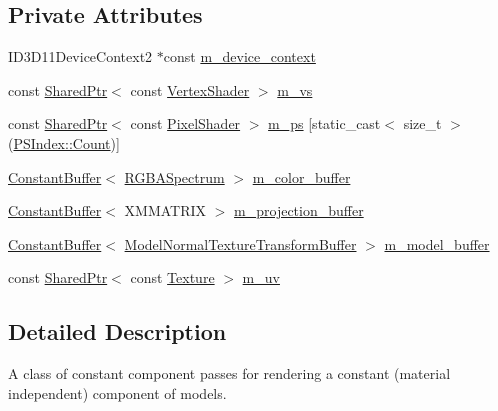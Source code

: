 \subsection*{Private Attributes}
\begin{DoxyCompactItemize}
\item 
I\+D3\+D11\+Device\+Context2 $\ast$const \hyperlink{classmage_1_1_constant_component_pass_af5a2ec9190b657a0e5cf3786c35f0336}{m\+\_\+device\+\_\+context}
\item 
const \hyperlink{namespacemage_a1e01ae66713838a7a67d30e44c67703e}{Shared\+Ptr}$<$ const \hyperlink{classmage_1_1_vertex_shader}{Vertex\+Shader} $>$ \hyperlink{classmage_1_1_constant_component_pass_aec78ab8193d28847ad591947f03f6515}{m\+\_\+vs}
\item 
const \hyperlink{namespacemage_a1e01ae66713838a7a67d30e44c67703e}{Shared\+Ptr}$<$ const \hyperlink{namespacemage_a27ecaf266420ee7a494d64edc0757129}{Pixel\+Shader} $>$ \hyperlink{classmage_1_1_constant_component_pass_a932366be8feba629aa2dd29a844e38b8}{m\+\_\+ps} \mbox{[}static\+\_\+cast$<$ size\+\_\+t $>$(\hyperlink{classmage_1_1_constant_component_pass_a5700234587f2aa0ebdb4f7790704f00bae93f994f01c537c4e2f7d8528c3eb5e9}{P\+S\+Index\+::\+Count})\mbox{]}
\item 
\hyperlink{structmage_1_1_constant_buffer}{Constant\+Buffer}$<$ \hyperlink{structmage_1_1_r_g_b_a_spectrum}{R\+G\+B\+A\+Spectrum} $>$ \hyperlink{classmage_1_1_constant_component_pass_aa1a97c7be7054c1a1362ca15d9909446}{m\+\_\+color\+\_\+buffer}
\item 
\hyperlink{structmage_1_1_constant_buffer}{Constant\+Buffer}$<$ X\+M\+M\+A\+T\+R\+IX $>$ \hyperlink{classmage_1_1_constant_component_pass_a6847024cc7d3b7f882e16c714c7ca8c8}{m\+\_\+projection\+\_\+buffer}
\item 
\hyperlink{structmage_1_1_constant_buffer}{Constant\+Buffer}$<$ \hyperlink{structmage_1_1_model_normal_texture_transform_buffer}{Model\+Normal\+Texture\+Transform\+Buffer} $>$ \hyperlink{classmage_1_1_constant_component_pass_a012197b5473955c356d2fbc48f9d3e8b}{m\+\_\+model\+\_\+buffer}
\item 
const \hyperlink{namespacemage_a1e01ae66713838a7a67d30e44c67703e}{Shared\+Ptr}$<$ const \hyperlink{classmage_1_1_texture}{Texture} $>$ \hyperlink{classmage_1_1_constant_component_pass_ad69f0d02de95b9125651b447cd8fd884}{m\+\_\+uv}
\end{DoxyCompactItemize}


\subsection{Detailed Description}
A class of constant component passes for rendering a constant (material independent) component of models. 

